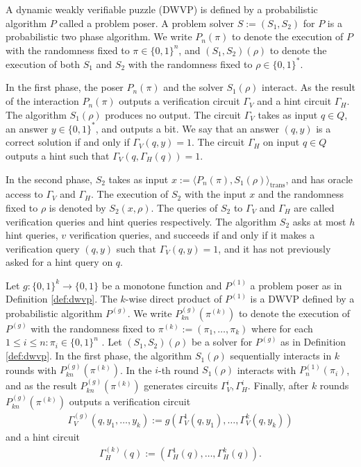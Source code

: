 \begin{definition}
  \label{def:dwvp}
  A dynamic weakly verifiable puzzle (DWVP) is defined by a probabilistic algorithm $P$
  called a problem poser.
  A problem solver $S := (S_1, S_2)$ for $P$ is a probabilistic two phase algorithm.
  We write $P_n(\pi)$ to denote the execution of $P$ with the randomness fixed to $\pi \in \{0,1\}^n$, and $(S_1,S_2)(\rho)$
  to denote the execution of both $S_1$ and $S_2$ with the randomness fixed to $\rho \in \{0,1\}^{*}$.

  In the first phase, the poser $P_n(\pi)$ and the solver $S_1(\rho)$ interact.
  As the result of the interaction $P_n(\pi)$ outputs a verification circuit $\Gamma_{V}$ and a hint circuit $\Gamma_{H}$.
  The algorithm $S_1(\rho)$ produces no output.
  The circuit $\Gamma_{V}$ takes as input $q \in Q$, an answer $y \in \{0,1\}^*$,
  and outputs a bit. We say that an answer $(q,y)$ is a correct solution if and only if $\Gamma_V(q,y) = 1$.
  The circuit $\Gamma_H$ on input $q \in Q$ outputs a hint such that $\Gamma_V(q,\Gamma_H(q)) = 1$.

  In the second phase, $S_2$ takes as input $x := \langle P_n(\pi), S_1(\rho) \rangle_{\text{trans}}$,
  and has oracle access to $\Gamma_V$ and $\Gamma_H$.
  The execution of $S_2$ with the input $x$ and the randomness fixed to $\rho$
  is denoted by $S_2(x, \rho)$. The queries of $S_2$ to $\Gamma_V$ and $\Gamma_H$ are called verification queries and hint queries respectively.
  The algorithm $S_2$ asks at most $h$ hint queries, $v$ verification queries, and succeeds if and only if
  it makes a verification query $(q,y)$ such that $\Gamma_V(q,y) = 1$, and it has not previously asked for a hint query on $q$.
\end{definition}
%
\begin{definition}
  Let $g: \{0,1\}^{k} \rightarrow \{0,1\}$ be a monotone function and $P^{(1)}$ a problem poser as in Definition \ref{def:dwvp}.
  The $k$-wise direct product of $P^{(1)}$ is a DWVP defined by a probabilistic algorithm $P^{(g)}$.
  We write $P_{kn}^{(g)}(\pi^{(k)})$ to denote the execution of $P^{(g)}$ with the randomness fixed to $\pi^{(k)} := (\pi_1, \dots, \pi_k)$
  where for each $1 \leq i \leq n : \pi_i \in \{0,1\}^n$ .
  Let $(S_1, S_2)(\rho)$ be a solver for $P^{(g)}$ as in Definition \ref{def:dwvp}.
  In the first phase, the algorithm $S_1(\rho)$ sequentially interacts in $k$ rounds with $P_{kn}^{(g)}(\pi^{(k)})$.
  In the $i$-th round $S_1(\rho)$ interacts with $P_n^{(1)}(\pi_i)$,
  and as the result $P_{kn}^{(g)}(\pi^{(k)})$ generates circuits $\Gamma_V^i, \Gamma_H^i$.
  Finally, after $k$ rounds $P_{kn}^{(g)}(\pi^{(k)})$ outputs a verification circuit
\begin{align*}
  \Gamma_V^{(g)} (q, y_1, \dots, y_k) := g(\Gamma_V^{1}(q, y_1), \dots, \Gamma_V^{k}(q, y_k))
\end{align*}
and a hint circuit
\begin{align*}
  \Gamma_H^{(k)} (q) := (\Gamma_H^{1}(q), \dots, \Gamma_H^{k}(q)).
\end{align*}
\end{definition}
